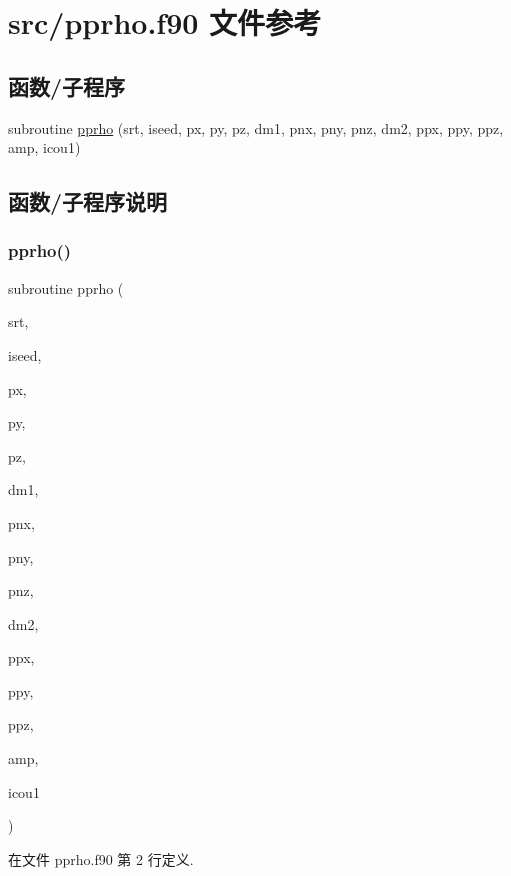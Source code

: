 \hypertarget{pprho_8f90}{}\section{src/pprho.f90 文件参考}
\label{pprho_8f90}
\subsection*{函数/子程序}
\begin{DoxyCompactItemize}
\item 
subroutine \mbox{\hyperlink{pprho_8f90_a12464f29a9b7eab7d9061308c9094a1a}{pprho}} (srt, iseed, px, py, pz, dm1, pnx, pny, pnz, dm2, ppx, ppy, ppz, amp, icou1)
\end{DoxyCompactItemize}


\subsection{函数/子程序说明}
\mbox{\label{pprho_8f90_a12464f29a9b7eab7d9061308c9094a1a}} 
\subsubsection{\texorpdfstring{pprho()}{pprho()}}
{\footnotesize\ttfamily subroutine pprho (\begin{DoxyParamCaption}\item[{}]{srt,  }\item[{}]{iseed,  }\item[{}]{px,  }\item[{}]{py,  }\item[{}]{pz,  }\item[{}]{dm1,  }\item[{}]{pnx,  }\item[{}]{pny,  }\item[{}]{pnz,  }\item[{}]{dm2,  }\item[{}]{ppx,  }\item[{}]{ppy,  }\item[{}]{ppz,  }\item[{}]{amp,  }\item[{}]{icou1 }\end{DoxyParamCaption})}



在文件 pprho.\+f90 第 2 行定义.

